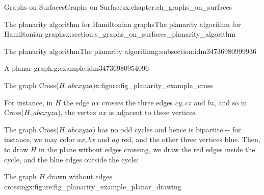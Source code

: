 \documentclass[oneside,10pt,]{book}
\numberwithin{equation}{section}
\begin{document}
\begin{chapterptx}{Graphs on Surfaces}{}{Graphs on Surfaces}{}{}{x:chapter:ch_graphs_on_surfaces}
\begin{sectionptx}{The planarity algorithm for Hamiltonian graphs}{}{The planarity algorithm for Hamiltonian graphs}{}{}{x:section:s_graphs_on_surfaces_planarity_algorithm}
\begin{subsectionptx}{The planarity algorithm}{}{The planarity algorithm}{}{}{g:subsection:idm34736980999936}
\begin{example}{A planar graph.}{g:example:idm34736980954096}
\begin{figureptx}{The graph Cross(\(H, abcxyza)\)}{x:figure:fig_planarity_example_cross}{}
\begin{image}{0.15}{0.7}{0.15}
{
}%
\end{image}%
\tcblower
\end{figureptx}%
For instance, in \(H\) the edge \(ax\) crosses the three edges \(cy, cz\) and \(bz\), and so in Cross(\(H, abcxyza\)), the vertex \(ax\) is adjacent to these vertices.%
\par
The graph Cross(\(H, abcxyza)\) has no odd cycles and hence is bipartite -{}-{} for instance, we may color \(ax, bx\) and \(ay\) red, and the other three vertices blue.  Then, to draw \(H\) in the plane without edges crossing, we draw the red edges inside the cycle, and the blue edges outside the cycle:%
\begin{figureptx}{The graph \(H\) drawn without edges crossing}{x:figure:fig_planarity_example_planar_drawing}{}%
\begin{image}{0.15}{0.7}{0.15}%
\end{image}
\end{figureptx}
\end{example}
\end{subsectionptx}
\end{sectionptx}
\end{chapterptx}
\end{document}
